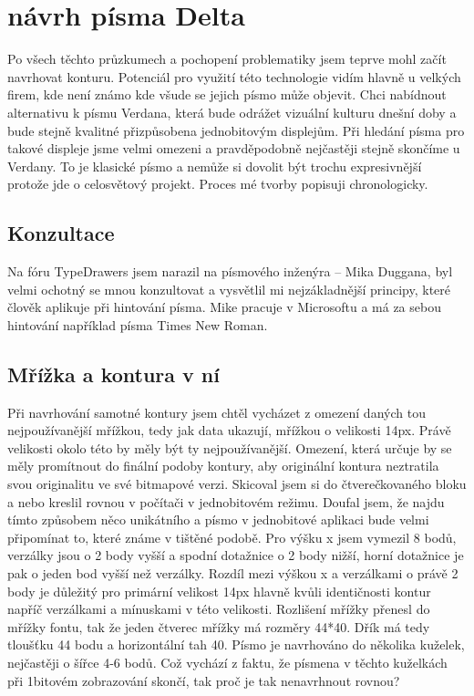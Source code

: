 \documentclass[a4paper]{article}
\begin{document}
\section{návrh písma Delta}
Po všech těchto průzkumech a pochopení problematiky jsem teprve mohl začít navrhovat konturu. Potenciál pro využití této technologie vidím hlavně u velkých firem, kde není známo kde všude se jejich písmo může objevit. Chci nabídnout alternativu k písmu Verdana, která bude odrážet vizuální kulturu dnešní doby a bude stejně kvalitné přizpůsobena jednobitovým displejům. Při hledání písma pro takové displeje jsme velmi omezeni a pravděpodobně nejčastěji stejně skončíme u Verdany. To je klasické písmo a nemůže si dovolit být trochu expresivnější protože jde o celosvětový projekt. Proces mé tvorby popisuji chronologicky.
\subsection{Konzultace}
Na fóru TypeDrawers jsem narazil na písmového inženýra – Mika Duggana, byl velmi ochotný se mnou konzultovat a vysvětlil mi nejzákladnější principy, které člověk aplikuje při hintování písma. Mike pracuje v Microsoftu a má za sebou hintování například písma Times New Roman.
\subsection{Mřížka a kontura v ní}
Při navrhování samotné kontury jsem chtěl vycházet z omezení daných tou nejpoužívanější mřížkou, tedy jak data ukazují, mřížkou o velikosti 14px. Právě velikosti okolo této by měly být ty nejpoužívanější. Omezení, která určuje by se měly promítnout do finální podoby kontury, aby originální kontura neztratila svou originalitu ve své bitmapové verzi. Skicoval jsem si do čtverečkovaného bloku a nebo kreslil rovnou v počítači v jednobitovém režimu. Doufal jsem, že najdu tímto způsobem něco unikátního a písmo v jednobitové aplikaci bude velmi připomínat to, které známe v tištěné podobě. Pro výšku x jsem vymezil 8 bodů, verzálky jsou o 2 body vyšší a spodní dotažnice o 2 body nižší, horní dotažnice je pak o jeden bod vyšší než verzálky. Rozdíl mezi výškou x a verzálkami o právě 2 body je důležitý pro primární velikost 14px hlavně kvůli identičnosti kontur napříč verzálkami a mínuskami v této velikosti. Rozlišení mřížky přenesl do mřížky fontu, tak že jeden čtverec mřížky má rozměry 44*40. Dřík má tedy tloušťku 44 bodu a horizontální tah 40. Písmo je navrhováno do několika kuželek, nejčastěji o šířce 4-6 bodů. Což vychází z faktu, že písmena v těchto kuželkách při 1bitovém zobrazování skončí, tak proč je tak nenavrhnout rovnou?
\end{document}
